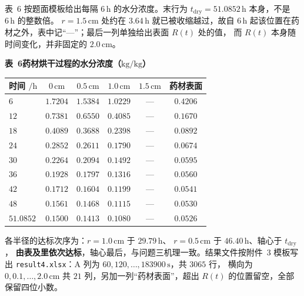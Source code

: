 \documentclass[withoutpreface,bwprint]{cumcmthesis} %
\begin{document}
表~6 按题面模板给出每隔 $6\,\mathrm{h}$ 的水分浓度。末行为
$t_{\mathrm{dry}}=51.0852\,\mathrm{h}$ 本身，不是 $6\,\mathrm{h}$ 的整数倍。
$r=1.5\,\mathrm{cm}$ 处约在 $3.64\,\mathrm{h}$ 就已被收缩越过，故自 $6\,\mathrm{h}$
起该位置在药材之外，表中记“—”；最后一列单独给出表面 $R(t)$ 处的值，
而 $R(t)$ 本身随时间变化，并非固定的 $2.0\,\mathrm{cm}$。

\begin{table}[htbp]
\centering
\begin{minipage}{0.94\textwidth}
\centering\small
\textbf{表~6\quad 药材烘干过程的水分浓度（$\mathrm{kg/kg}$）}\\[3pt]
\begin{tabular}{lccccc}
\toprule
时间 $/\mathrm{h}$ & $0\,\mathrm{cm}$ & $0.5\,\mathrm{cm}$ & $1.0\,\mathrm{cm}$
 & $1.5\,\mathrm{cm}$ & 药材表面 \\
\midrule
$6$      & $1.7204$ & $1.5384$ & $1.0229$ & — & $0.4206$ \\
$12$     & $0.7381$ & $0.6550$ & $0.4085$ & — & $0.1670$ \\
$18$     & $0.4089$ & $0.3688$ & $0.2398$ & — & $0.0892$ \\
$24$     & $0.2852$ & $0.2611$ & $0.1790$ & — & $0.0674$ \\
$30$     & $0.2264$ & $0.2094$ & $0.1492$ & — & $0.0595$ \\
$36$     & $0.1928$ & $0.1797$ & $0.1316$ & — & $0.0560$ \\
$42$     & $0.1712$ & $0.1604$ & $0.1199$ & — & $0.0541$ \\
$48$     & $0.1561$ & $0.1468$ & $0.1115$ & — & $0.0530$ \\
$51.0852$ & $\mathbf{0.1500}$ & $0.1413$ & $0.1080$ & — & $0.0526$ \\
\bottomrule
\end{tabular}

\vspace{3pt}
\end{minipage}
\label{tab:q4}
\end{table}

\noindent 各半径的达标次序为：$r=1.0\,\mathrm{cm}$ 于 $29.79\,\mathrm{h}$、
$r=0.5\,\mathrm{cm}$ 于 $46.40\,\mathrm{h}$、轴心于 $t_{\mathrm{dry}}$，
\textbf{由表及里依次达标}，轴心最后，与问题三机理一致。结果文件按附件~3 模板写出
\texttt{result4.xlsx}：A 列为 $60,120,\dots,183900\,\mathrm{s}$，共 $3065$ 行，
横向为 $0,0.1,\dots,2.0\,\mathrm{cm}$ 共 $21$ 列，另加一列“药材表面”，超出 $R(t)$
的位置留空，全部保留四位小数。
\end{document}
